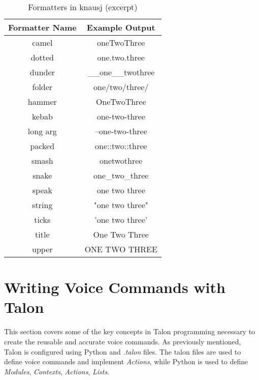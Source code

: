 \documentclass[../thesis.tex]{subfiles}
\begin{document}
\begin{table}[htpb]
   \centering
   \begin{tabular}{|c|c|}
      \toprule
      Formatter Name & Example Output \\
      \midrule
      camel & oneTwoThree  \\
      dotted & one.two.three  \\
      dunder & \_\_one\_\_twothree  \\
      folder & one/two/three/  \\
      hammer & OneTwoThree  \\
      kebab & one-two-three  \\
      long arg & --one-two-three  \\
      packed & one::two::three  \\
      smash & onetwothree  \\
      snake & one\_two\_three  \\
      speak & one two three  \\
      string & "one two three"  \\
      ticks & 'one two three'  \\
      title & One Two Three  \\
      upper & ONE TWO THREE  \\
      \bottomrule
   \end{tabular}
   \caption{Formatters in knausj (excerpt)}
   \label{tab:formatters}
\end{table}





\section{Writing Voice Commands with Talon}\label{wvc}
This section covers some of the key concepts in Talon programming necessary to
create the reusable and accurate voice commands.
As previously mentioned, Talon is configured using Python and \textit{.talon} files.
The talon files are used to define voice commands and implement \textit{Actions}, while Python is used to
define \textit{Modules}, \textit{Contexts}, \textit{Actions}, \textit{Lists}.
\end{document}
